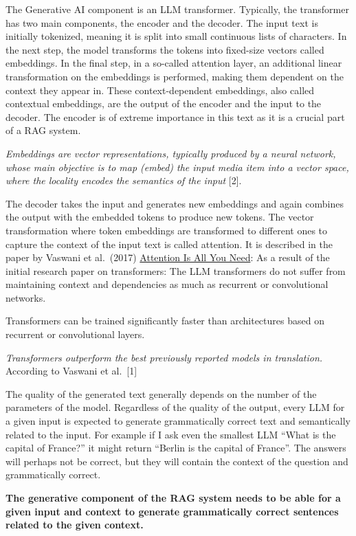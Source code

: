 \documentclass[11pt]{wseas}
\begin{document}
The Generative AI component is an LLM transformer. Typically, the
transformer has two main components, the encoder and the decoder. The
input text is initially tokenized, meaning it is split into small
continuous lists of characters. In the next step, the model transforms
the tokens into fixed-size vectors called embeddings. In the final step,
in a so-called attention layer, an additional linear transformation on
the embeddings is performed, making them dependent on the context they
appear in. These context-dependent embeddings, also called contextual
embeddings, are the output of the encoder and the input to the decoder.
The encoder is of extreme importance in this text as it is a crucial
part of a RAG system.

\emph{Embeddings are vector representations, typically produced by a
neural network, whose main objective is to map (embed) the input media
item into a vector space, where the locality encodes the semantics of
the input} {[}2{]}.

The decoder takes the input and generates new embeddings and again
combines the output with the embedded tokens to produce new tokens. The
vector transformation where token embeddings are transformed to
different ones to capture the context of the input text is called
attention. It is described in the paper by Vaswani et al.~(2017)
\href{https://arxiv.org/pdf/1706.03762}{Attention Is All You Need}: As a
result of the initial research paper on transformers: The LLM
transformers do not suffer from maintaining context and dependencies as
much as recurrent or convolutional networks.

Transformers can be trained significantly faster than architectures
based on recurrent or convolutional layers.

\emph{Transformers outperform the best previously reported models in
translation.} According to Vaswani et al.~{[}1{]}

The quality of the generated text generally depends on the number of the
parameters of the model. Regardless of the quality of the output, every
LLM for a given input is expected to generate grammatically correct text
and semantically related to the input. For example if I ask even the
smallest LLM ``What is the capital of France?'' it might return ``Berlin
is the capital of France''. The answers will perhaps not be correct, but
they will contain the context of the question and grammatically correct.

\textbf{The generative component of the RAG system needs to be able for
a given input and context to generate grammatically correct sentences
related to the given context.}
\end{document}
